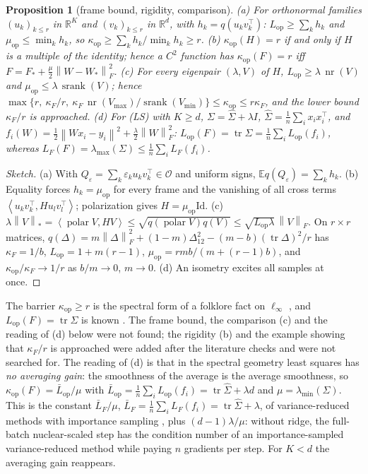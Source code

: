 \documentclass[11pt]{article}
\newtheorem{proposition}[theorem]{Proposition}
\theoremstyle{remark}
\newcommand{\R}{\mathbb{R}}
\newcommand{\E}{\mathbb{E}}
\newcommand{\norm}[1]{\left\|#1\right\|}
\newcommand{\nnuc}[1]{\left\|#1\right\|_{*}}
\newcommand{\nF}[1]{\left\|#1\right\|_{F}}
\newcommand{\inner}[2]{\left\langle #1, #2 \right\rangle}
\newcommand{\tr}{\operatorname{tr}}
\newcommand{\polar}{\operatorname{polar}}
\newcommand{\srank}{\operatorname{srank}}
\newcommand{\nr}{\operatorname{nr}}
\newcommand{\Lop}{L_{\mathrm{op}}}
\newcommand{\muop}{\mu_{\mathrm{op}}}
\newcommand{\kop}{\kappa_{\mathrm{op}}}
\newcommand{\kF}{\kappa_{F}}
\newcommand{\cO}{\mathcal{O}}
\newcommand{\lmin}{\lambda_{\min}}
\newcommand{\lmax}{\lambda_{\max}}
\begin{document}
\begin{proposition}[frame bound, rigidity, comparison]\label{prop:frame}
(a) For orthonormal families $(u_k)_{k\le r}$ in $\R^K$ and $(v_k)_{k\le r}$ in $\R^d$, with $h_k=q(u_kv_k^\top)$:
$\Lop\ge\sum_kh_k$ and $\muop\le\min_kh_k$, so $\kop\ge\sum_kh_k/\min_kh_k\ge r$.
(b) $\kop(H)=r$ if and only if $H$ is a multiple of the identity; hence a $C^2$ function has $\kop(F)=r$ iff
$F=F_\ast+\frac\mu2\nF{W-W_\ast}^2$.
(c) For every eigenpair $(\lambda,V)$ of $H$, $\Lop\ge\lambda\,\nr(V)$ and $\muop\le\lambda\,\srank(V)$; hence
$\max\{r,\ \kF/r,\ \kF\,\nr(V_{\max})/\srank(V_{\min})\}\le\kop\le r\kF$, and the lower bound $\kF/r$ is approached.
(d) For (LS) with $K\ge d$, $\Sigma=\hat\Sigma+\lambda I$, $\hat\Sigma=\frac1n\sum_ix_ix_i^\top$, and
$f_i(W)=\frac12\norm{Wx_i-y_i}^2+\frac\lambda2\nF W^2$:
$\Lop(F)=\tr\Sigma=\frac1n\sum_i\Lop(f_i)$, whereas $L_F(F)=\lmax(\Sigma)\le\frac1n\sum_iL_F(f_i)$.
\end{proposition}
\begin{proof}[Sketch]
(a) With $Q_\varepsilon=\sum_k\varepsilon_ku_kv_k^\top\in\cO$ and uniform signs, $\E q(Q_\varepsilon)=\sum_kh_k$. (b) Equality
forces $h_k=\muop$ for every frame and the vanishing of all cross terms $\inner{u_kv_k^\top}{Hu_lv_l^\top}$; polarization
gives $H=\muop\mathrm{Id}$. (c) $\lambda\nnuc V=\inner{\polar V}{HV}\le\sqrt{q(\polar V)q(V)}\le\sqrt{\Lop\lambda}\,\nF V$.
On $r\times r$ matrices, $q(\Delta)=m\nF\Delta^2+(1-m)\Delta_{12}^2-(m-b)(\tr\Delta)^2/r$ has $\kF=1/b$, $\Lop=1+m(r-1)$,
$\muop=rmb/(m+(r-1)b)$, and $\kop/\kF\to1/r$ as $b/m\to0$, $m\to0$. (d) An isometry excites all samples at once.
\end{proof}
The barrier $\kop\ge r$ is the spectral form of a folklore fact on $\ell_\infty$ \cite{sidford2018coordinate}, and
$\Lop(F)=\tr\Sigma$ is known \cite{davis2025spectral,jawanpuria2026constant,shen2025convergence}. The frame bound, the
comparison (c) and the reading of (d) below were not found; the rigidity (b) and the example showing that $\kF/r$ is
approached were added after the literature checks and were not searched for. The reading of (d) is that in the spectral
geometry least squares has \emph{no averaging gain}: the smoothness of the average is the average smoothness, so
$\kop(F)=\bar L_{\mathrm{op}}/\mu$ with $\bar L_{\mathrm{op}}=\frac1n\sum_i\Lop(f_i)=\tr\hat\Sigma+\lambda d$ and
$\mu=\lmin(\Sigma)$. This is the constant $\bar L_F/\mu$, $\bar L_F=\frac1n\sum_iL_F(f_i)=\tr\hat\Sigma+\lambda$, of
variance-reduced methods with importance sampling \cite{xiao2014proximal}, plus $(d-1)\lambda/\mu$: without ridge, the
full-batch nuclear-scaled step has the condition number of an importance-sampled variance-reduced method while paying
$n$ gradients per step. For $K<d$ the averaging gain reappears.
\end{document}
